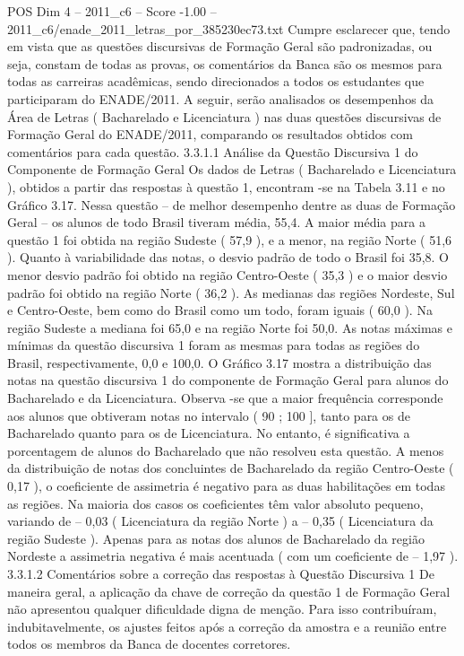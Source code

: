 \begin{textsample}{POS Dim 4 – 2011\_c6 – Score -1.00 – 2011\_c6/enade\_2011\_letras\_por\_385230ec73.txt}
Cumpre esclarecer que, tendo em vista que as questões discursivas de Formação Geral são padronizadas, ou seja, constam de todas as provas, os comentários da Banca são os mesmos para todas as carreiras acadêmicas, sendo direcionados a todos os estudantes que participaram do ENADE/2011.
A seguir, serão analisados os desempenhos da Área de Letras ( Bacharelado e Licenciatura ) nas duas questões discursivas de Formação Geral do ENADE/2011, comparando os resultados obtidos com comentários para cada questão. 3.3.1.1 Análise da Questão Discursiva 1 do Componente de Formação Geral Os dados de Letras ( Bacharelado e Licenciatura ), obtidos a partir das respostas à questão 1, encontram -se na Tabela 3.11 e no Gráfico 3.17.
Nessa questão – de melhor desempenho dentre as duas de Formação Geral – os alunos de todo Brasil tiveram média, 55,4.
A maior média para a questão 1 foi obtida na região Sudeste ( 57,9 ), e a menor, na região Norte ( 51,6 ).
Quanto à variabilidade das notas, o desvio padrão de todo o Brasil foi 35,8.
O menor desvio padrão foi obtido na região Centro-Oeste ( 35,3 ) e o maior desvio padrão foi obtido na região Norte ( 36,2 ).
As medianas das regiões Nordeste, Sul e Centro-Oeste, bem como do Brasil como um todo, foram iguais ( 60,0 ).
Na região Sudeste a mediana foi 65,0 e na região Norte foi 50,0.
As notas máximas e mínimas da questão discursiva 1 foram as mesmas para todas as regiões do Brasil, respectivamente, 0,0 e 100,0.
O Gráfico 3.17 mostra a distribuição das notas na questão discursiva 1 do componente de Formação Geral para alunos do Bacharelado e da Licenciatura.
Observa -se que a maior frequência corresponde aos alunos que obtiveram notas no intervalo ( 90 ; 100 ], tanto para os de Bacharelado quanto para os de Licenciatura.
No entanto, é significativa a porcentagem de alunos do Bacharelado que não resolveu esta questão.
A menos da distribuição de notas dos concluintes de Bacharelado da região Centro-Oeste ( 0,17 ), o coeficiente de assimetria é negativo para as duas habilitações em todas as regiões.
Na maioria dos casos os coeficientes têm valor absoluto pequeno, variando de – 0,03 ( Licenciatura da região Norte ) a – 0,35 ( Licenciatura da região Sudeste ).
Apenas para as notas dos alunos de Bacharelado da região Nordeste a assimetria negativa é mais acentuada ( com um coeficiente de – 1,97 ). 3.3.1.2 Comentários sobre a correção das respostas à Questão Discursiva 1 De maneira geral, a aplicação da chave de correção da questão 1 de Formação Geral não apresentou qualquer dificuldade digna de menção.
Para isso contribuíram, indubitavelmente, os ajustes feitos após a correção da amostra e a reunião entre todos os membros da Banca de docentes corretores.

\end{textsample}
